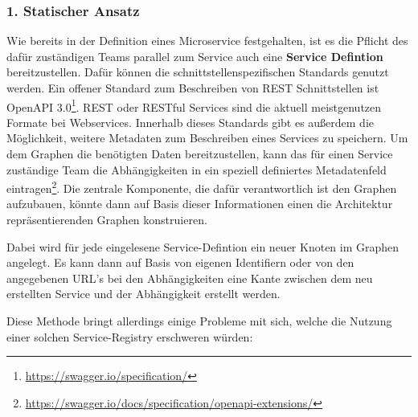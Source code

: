 \documentclass[
	12pt,
	BCOR=5mm,
	DIV=12,
	headinclude=on,
	footinclude=off,
	parskip=half,
	bibliography=totoc,
	listof=entryprefix,
	toc=listof,
	numbers=noenddot,
	plainfootsepline
]{scrreprt}
\begin{document}
\subsubsection*{1. Statischer Ansatz}
Wie bereits in der Definition eines Microservice festgehalten, ist es die Pflicht des dafür zuständigen Teams parallel zum Service auch eine \textbf{Service Defintion} bereitzustellen. Dafür können die schnittstellenspezifischen Standards genutzt werden. Ein offener Standard zum Beschreiben von REST Schnittstellen ist OpenAPI 3.0\footnote{\url{https://swagger.io/specification/}}. REST oder RESTful Services sind die aktuell meistgenutzen Formate bei Webservices. Innerhalb dieses Standards gibt es außerdem die Möglichkeit, weitere Metadaten zum Beschreiben eines Services zu speichern. Um dem Graphen die benötigten Daten bereitzustellen, kann das für einen Service zuständige Team die Abhängigkeiten in ein speziell definiertes Metadatenfeld eintragen\footnote{\url{https://swagger.io/docs/specification/openapi-extensions/}}. Die zentrale Komponente, die dafür verantwortlich ist den Graphen aufzubauen, könnte dann auf Basis dieser Informationen einen die Architektur repräsentierenden Graphen konstruieren. 

Dabei wird für jede eingelesene Service-Defintion ein neuer Knoten im Graphen angelegt. Es kann dann auf Basis von eigenen Identifiern oder von den angegebenen URL's bei den Abhängigkeiten eine Kante zwischen dem neu erstellten Service und der Abhängigkeit erstellt werden.


Diese Methode bringt allerdings einige Probleme mit sich, welche die Nutzung einer solchen Service-Registry erschweren würden:
\end{document}
